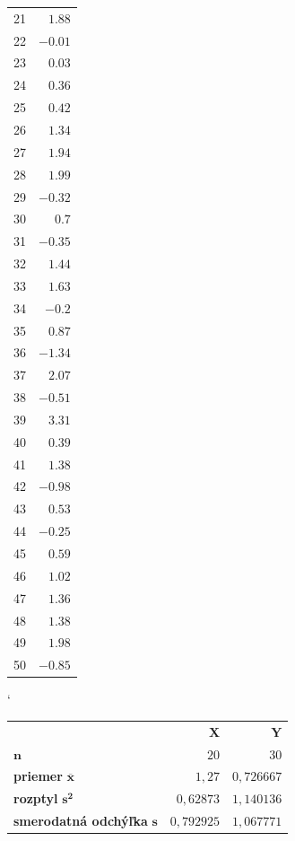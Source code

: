 \documentclass[pdftex, 11pt, a4paper, titlepage]{article}
\begin{document}
\begin{table}[H]
\begin{tabular}[t]{r|r|}
			21 & $ 1.88 $ \\ \cline{2-2}
			22 & $ -0.01 $ \\ \cline{2-2}
			23 & $ 0.03 $ \\ \cline{2-2}
			24 & $ 0.36 $ \\ \cline{2-2}
			25 & $ 0.42 $ \\ \cline{2-2}
			26 & $ 1.34 $ \\ \cline{2-2}
			27 & $ 1.94 $ \\ \cline{2-2}
			28 & $ 1.99 $ \\ \cline{2-2}
			29 & $ -0.32 $ \\ \cline{2-2}
			30 & $ 0.7 $ \\ \cline{2-2}
			31 & $ -0.35 $ \\ \cline{2-2}
			32 & $ 1.44 $ \\ \cline{2-2}
			33 & $ 1.63 $ \\ \cline{2-2}
			34 & $ -0.2 $ \\ \cline{2-2}
			35 & $ 0.87 $ \\ \cline{2-2}
			36 & $ -1.34 $ \\ \cline{2-2}
			37 & $ 2.07 $ \\ \cline{2-2}
			38 & $ -0.51 $ \\ \cline{2-2}
			39 & $ 3.31 $ \\ \cline{2-2}
			40 & $ 0.39 $ \\ \cline{2-2}
			41 & $ 1.38 $ \\ \cline{2-2}
			42 & $ -0.98 $ \\ \cline{2-2}
			43 & $ 0.53 $ \\ \cline{2-2}
			44 & $ -0.25 $ \\ \cline{2-2}
			45 & $ 0.59 $ \\ \cline{2-2}
			46 & $ 1.02 $ \\ \cline{2-2}
			47 & $ 1.36 $ \\ \cline{2-2}
			48 & $ 1.38 $ \\ \cline{2-2}
			49 & $ 1.98 $ \\ \cline{2-2}
			50 & $ -0.85 $ \\ \cline{2-2}
		\end{tabular}
	\end{table}

    \begin{table}[H]
        \catcode`
        \begin{tabular}{l|r|r|}
            \cline{2-3}
            & $ \boldsymbol{X} $ & $ \boldsymbol{Y} $ \\
            \cline{2-3}
			$ \boldsymbol{n} $ & $ 20 $ & $ 30 $ \\
			\textbf{priemer} $ \boldsymbol{\overline{x}} $ & $ 1,27 $
			& $ 0,726667 $ \\

			\textbf{rozptyl} $ \boldsymbol{s^2} $ & $ 0,62873 $
			& $ 1,140136 $ \\

			\textbf{smerodatná odchýľka} $ \boldsymbol{s} $ & $ 0,792925 $
            & $ 1,067771 $ \\
            \cline{2-3}
		\end{tabular}
    \end{table}
\end{document}
